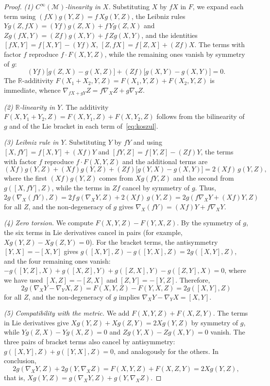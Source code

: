 \begin{proof}
\textit{(1) $C^\infty(\mathcal{M})$-linearity in $X$.} Substituting $X$ by $fX$ in $F$, we expand each term using $(fX)g(Y,Z) = f\,Xg(Y,Z)$, the Leibniz rules $Yg(Z,fX) = (Yf)g(Z,X) + f\,Yg(Z,X)$ and $Zg(fX,Y) = (Zf)g(X,Y) + f\,Zg(X,Y)$, and the identities $[fX,Y] = f[X,Y] - (Yf)X$, $[Z,fX] = f[Z,X] + (Zf)X$. The terms with factor $f$ reproduce $f \cdot F(X,Y,Z)$, while the remaining ones vanish by symmetry of $g$:
\[
(Yf)\bigl[g(Z,X) - g(X,Z)\bigr] + (Zf)\bigl[g(X,Y) - g(X,Y)\bigr] = 0.
\]
The $\mathbb{R}$-additivity $F(X_1+X_2,Y,Z) = F(X_1,Y,Z) + F(X_2,Y,Z)$ is immediate, whence $\nabla_{fX+gY}Z = f\nabla_X Z + g\nabla_Y Z$.

\textit{(2) $\mathbb{R}$-linearity in $Y$.} The additivity $F(X, Y_1+Y_2, Z) = F(X,Y_1,Z) + F(X,Y_2,Z)$ follows from the bilinearity of $g$ and of the Lie bracket in each term of~\eqref{eq:koszul}.

\textit{(3) Leibniz rule in $Y$.} Substituting $Y$ by $fY$ and using $[X,fY] = f[X,Y] + (Xf)Y$ and $[fY,Z] = f[Y,Z] - (Zf)Y$, the terms with factor $f$ reproduce $f \cdot F(X,Y,Z)$ and the additional terms are
\[
(Xf)g(Y,Z) + (Xf)g(Y,Z) + (Zf)\bigl[g(Y,X) - g(X,Y)\bigr] = 2(Xf)\,g(Y,Z),
\]
where the first $(Xf)g(Y,Z)$ comes from $Xg(fY,Z)$ and the second from $g([X,fY],Z)$, while the terms in $Zf$ cancel by symmetry of $g$. Thus, $2g(\nabla_X(fY),Z) = 2f\,g(\nabla_X Y, Z) + 2(Xf)\,g(Y,Z) = 2g(f\nabla_X Y + (Xf)Y, Z)$ for all $Z$, and the non-degeneracy of $g$ gives $\nabla_X(fY) = (Xf)Y + f\nabla_X Y$.

\textit{(4) Zero torsion.} We compute $F(X,Y,Z) - F(Y,X,Z)$. By the symmetry of $g$, the six terms in Lie derivatives cancel in pairs (for example, $Xg(Y,Z) - Xg(Z,Y) = 0$). For the bracket terms, the antisymmetry $[Y,X] = -[X,Y]$ gives $g([X,Y],Z) - g([Y,X],Z) = 2g([X,Y],Z)$, and the four remaining ones vanish: $-g([Y,Z],X) + g([X,Z],Y) + g([Z,X],Y) - g([Z,Y],X) = 0$, where we have used $[X,Z] = -[Z,X]$ and $[Z,Y] = -[Y,Z]$. Therefore,
\[
2g(\nabla_X Y - \nabla_Y X, Z) = F(X,Y,Z) - F(Y,X,Z) = 2g([X,Y], Z)
\]
for all $Z$, and the non-degeneracy of $g$ implies $\nabla_X Y - \nabla_Y X = [X,Y]$.

\textit{(5) Compatibility with the metric.} We add $F(X,Y,Z) + F(X,Z,Y)$. The terms in Lie derivatives give $Xg(Y,Z) + Xg(Z,Y) = 2Xg(Y,Z)$ by symmetry of $g$, while $Yg(Z,X) - Yg(X,Z) = 0$ and $Zg(Y,X) - Zg(X,Y) = 0$ vanish. The three pairs of bracket terms also cancel by antisymmetry: $g([X,Y],Z) + g([Y,X],Z) = 0$, and analogously for the others. In conclusion,
\[
2g(\nabla_X Y, Z) + 2g(Y, \nabla_X Z) = F(X,Y,Z) + F(X,Z,Y) = 2Xg(Y,Z),
\]
that is, $Xg(Y,Z) = g(\nabla_X Y, Z) + g(Y, \nabla_X Z)$.
\end{proof}

